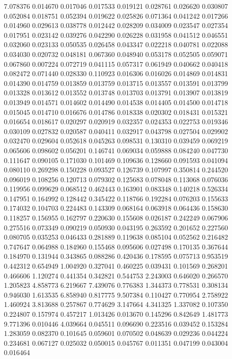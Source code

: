 7.078376
0.014670
0.017046
0.017533
0.019121
0.028761
0.026620
0.030807
0.052084
0.018751
0.052394
0.019622
0.025826
0.071364
0.041242
0.017266
0.014960
0.029613
0.038778
0.012442
0.028209
0.034009
0.023547
0.027354
0.017951
0.023142
0.039276
0.042290
0.026228
0.031958
0.041512
0.046551
0.032060
0.023133
0.050535
0.026458
0.043347
0.022218
0.040781
0.022088
0.034030
0.020732
0.048181
0.067360
0.048940
0.053178
0.052505
0.059071
0.067860
0.007224
0.072719
0.041115
0.057317
0.061949
0.040662
0.040418
0.082472
0.071440
0.028330
0.110923
0.016306
0.016026
0.014869
0.014831
0.014390
0.014759
0.013859
0.013759
0.013715
0.013557
0.013591
0.013799
0.013328
0.013612
0.013552
0.013748
0.013703
0.013791
0.013907
0.013819
0.013949
0.014571
0.014602
0.014490
0.014538
0.014405
0.014500
0.014718
0.015045
0.014710
0.016676
0.014786
0.018338
0.020302
0.018431
0.015321
0.016654
0.018617
0.020297
0.020919
0.032357
0.024353
0.022753
0.019346
0.030109
0.027832
0.020587
0.040411
0.032917
0.043798
0.027504
0.029902
0.032470
0.029604
0.052618
0.045263
0.098531
0.130310
0.039459
0.069219
0.065606
0.098602
0.056201
0.146741
0.069034
0.059888
0.084240
0.047730
0.111647
0.090105
0.171030
0.101469
0.109636
0.128660
0.091593
0.041094
0.080110
0.269298
0.150228
0.093527
0.126739
0.107997
0.350814
0.244520
0.096019
0.108256
0.120713
0.079302
0.125683
0.078048
0.113068
0.076036
0.119956
0.099629
0.068512
0.462443
0.163901
0.083348
0.140218
0.526334
0.147951
0.164992
0.128442
0.345422
0.118766
0.192284
0.076203
0.155633
0.174032
0.104703
0.224483
0.143309
0.068164
0.063918
0.064436
0.158630
0.118257
0.156955
0.162797
0.220630
0.155608
0.026187
0.242249
0.067906
0.275516
0.073349
0.090219
0.050930
0.043195
0.263592
0.201652
0.227560
0.080705
0.035253
0.046433
0.281889
0.119638
0.085104
0.052562
0.216482
0.747647
0.064988
0.184960
0.155468
0.095606
0.027498
0.170135
0.367644
0.184970
0.131944
0.343865
0.088286
0.420436
0.178595
0.075713
0.953519
0.442312
0.654949
1.004920
0.327041
0.460225
0.039431
0.101569
0.268201
0.466606
1.120274
0.441354
0.342821
0.544753
2.243003
0.646020
0.266570
1.205823
4.858773
6.219667
7.439076
0.776383
1.344373
0.778531
0.308134
0.946030
1.613535
6.858940
0.817775
9.507384
0.110427
0.770954
2.758922
1.460924
3.813688
0.257867
0.774629
3.147664
4.341325
1.337082
0.107350
0.224807
0.157974
0.457217
1.013426
0.013670
0.145296
0.842649
1.481773
9.771396
0.010446
4.039664
0.045511
0.096690
0.223516
0.039452
0.153284
1.283059
0.082370
0.101645
0.059601
0.070502
0.048639
0.029236
0.044224
0.234681
0.067127
0.025032
0.050015
0.045767
0.011351
0.047199
0.043004
0.016464
